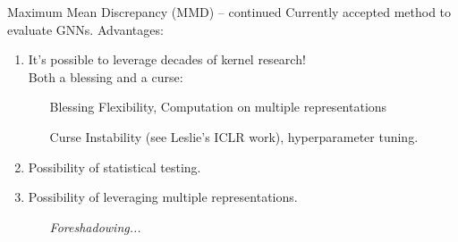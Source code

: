 \documentclass[aspectratio=169, 10pt, dvipsnames]{beamer}
\begin{document}
\begin{frame}[fragile]{Maximum Mean Discrepancy (MMD) -- continued}
  \small Currently accepted method to evaluate GNNs.
  Advantages:
  \begin{enumerate}
  \item \small It's possible to leverage decades of kernel research!\\ Both a
    \textcolor{PineGreen}{blessing} and a \textcolor{YellowOrange}{curse}:
    \begin{itemize}
    \item[\textcolor{PineGreen}{Blessing}] Flexibility, Computation on
      multiple representations
    \item[\textcolor{YellowOrange}{Curse}] Instability (see Leslie's ICLR work), hyperparameter tuning.
    \end{itemize}
  \item \small Possibility of statistical testing.
  \item \small Possibility of leveraging multiple representations.
    \begin{itemize}
    \item[] \emph{Foreshadowing...}
    \end{itemize}
  \end{enumerate}
\end{frame}
\end{document}
